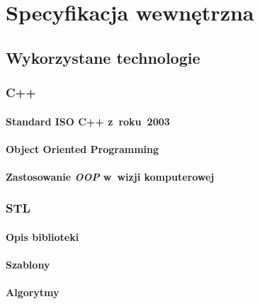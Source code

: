 \chapter{Specyfikacja wewnętrzna}\label{Chapter_SpecyfikacjaWewnetrzna}

  \section{Wykorzystane technologie}\label{Section_Technologie}

    \subsection{C++}\label{Subsection_Cpp}

      \subsubsection{Standard ISO C++ z~roku~2003}
        \cite{CppStroustrup}\cite{EffectiveCpp}\cite{MoreEffectiveCpp}

      \subsubsection{Object Oriented Programming}

      \subsubsection{Zastosowanie \textit{OOP} w~wizji komputerowej}

    \subsection{STL}\label{Subsection_STL}

      \subsubsection{Opis biblioteki}
        \cite{EffectiveStl}

      \subsubsection{Szablony}

      \subsubsection{Algorytmy}

